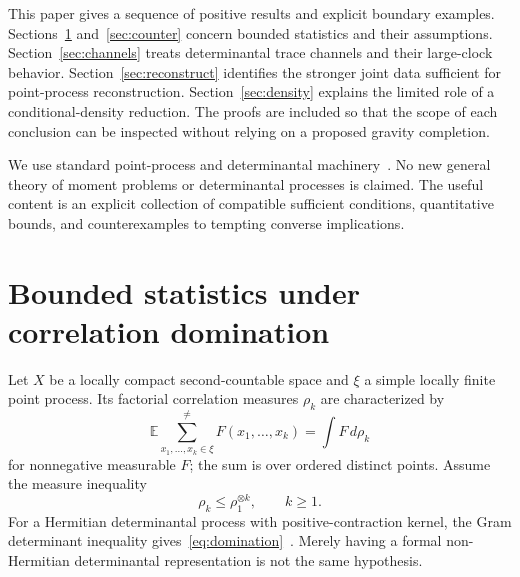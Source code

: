 \documentclass[11pt,a4paper]{article}
\theoremstyle{remark}\newtheorem{remark}[theorem]{Remark}
\newcommand{\E}{\mathbb E}
\begin{document}
This paper gives a sequence of positive results and explicit boundary examples.
Sections~\ref{sec:bounded} and~\ref{sec:counter} concern bounded statistics and their assumptions.
Section~\ref{sec:channels} treats determinantal trace channels and their large-clock behavior.
Section~\ref{sec:reconstruct} identifies the stronger joint data sufficient for point-process reconstruction.
Section~\ref{sec:density} explains the limited role of a conditional-density reduction.
The proofs are included so that the scope of each conclusion can be inspected without relying on a proposed gravity completion.

We use standard point-process and determinantal machinery~\citep{Soshnikov2000,Lyons2003}.
No new general theory of moment problems or determinantal processes is claimed.
The useful content is an explicit collection of compatible sufficient conditions, quantitative bounds, and counterexamples to tempting converse implications.

\section{Bounded statistics under correlation domination}\label{sec:bounded}
Let $X$ be a locally compact second-countable space and $\xi$ a simple locally finite point process.
Its factorial correlation measures $\rho_k$ are characterized by
\begin{equation}
 \E\sum_{x_1,\ldots,x_k\in\xi}^{\ne}F(x_1,\ldots,x_k)
 =\int F\,d\rho_k
\end{equation}
for nonnegative measurable $F$; the sum is over ordered distinct points.
Assume the measure inequality
\begin{equation}\label{eq:domination}
 \rho_k\le\rho_1^{\otimes k},\qquad k\ge1.
\end{equation}
For a Hermitian determinantal process with positive-contraction kernel, the Gram determinant inequality gives~\eqref{eq:domination}~\citep{Soshnikov2000,Lyons2003}.
Merely having a formal non-Hermitian determinantal representation is not the same hypothesis.
\end{document}
